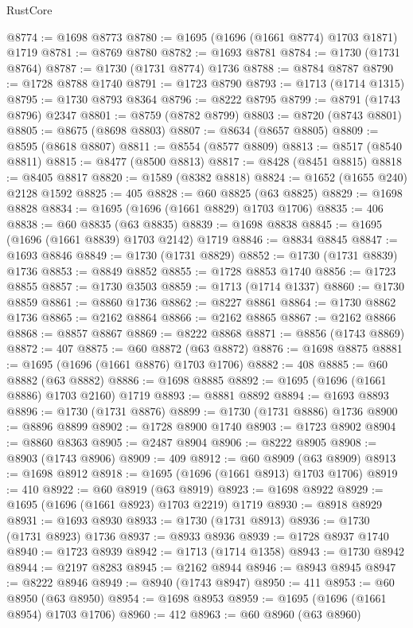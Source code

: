 \begin{lexlean}{RustCore}
\begin{coremodule}
@8774 := @1698 @8773
@8780 := @1695 (@1696 (@1661 @8774) @1703 @1871) @1719
@8781 := @8769 @8780
@8782 := @1693 @8781
@8784 := @1730 (@1731 @8764)
@8787 := @1730 (@1731 @8774) @1736
@8788 := @8784 @8787
@8790 := @1728 @8788 @1740
@8791 := @1723 @8790
@8793 := @1713 (@1714 @1315)
@8795 := @1730 @8793 @8364
@8796 := @8222 @8795
@8799 := @8791 (@1743 @8796) @2347
@8801 := @8759 (@8782 @8799)
@8803 := @8720 (@8743 @8801)
@8805 := @8675 (@8698 @8803)
@8807 := @8634 (@8657 @8805)
@8809 := @8595 (@8618 @8807)
@8811 := @8554 (@8577 @8809)
@8813 := @8517 (@8540 @8811)
@8815 := @8477 (@8500 @8813)
@8817 := @8428 (@8451 @8815)
@8818 := @8405 @8817
@8820 := @1589 (@8382 @8818)
@8824 := @1652 (@1655 @240) @2128 @1592
@8825 := 405
@8828 := @60 @8825 (@63 @8825)
@8829 := @1698 @8828
@8834 := @1695 (@1696 (@1661 @8829) @1703 @1706)
@8835 := 406
@8838 := @60 @8835 (@63 @8835)
@8839 := @1698 @8838
@8845 := @1695 (@1696 (@1661 @8839) @1703 @2142) @1719
@8846 := @8834 @8845
@8847 := @1693 @8846
@8849 := @1730 (@1731 @8829)
@8852 := @1730 (@1731 @8839) @1736
@8853 := @8849 @8852
@8855 := @1728 @8853 @1740
@8856 := @1723 @8855
@8857 := @1730 @3503
@8859 := @1713 (@1714 @1337)
@8860 := @1730 @8859
@8861 := @8860 @1736
@8862 := @8227 @8861
@8864 := @1730 @8862 @1736
@8865 := @2162 @8864
@8866 := @2162 @8865
@8867 := @2162 @8866
@8868 := @8857 @8867
@8869 := @8222 @8868
@8871 := @8856 (@1743 @8869)
@8872 := 407
@8875 := @60 @8872 (@63 @8872)
@8876 := @1698 @8875
@8881 := @1695 (@1696 (@1661 @8876) @1703 @1706)
@8882 := 408
@8885 := @60 @8882 (@63 @8882)
@8886 := @1698 @8885
@8892 := @1695 (@1696 (@1661 @8886) @1703 @2160) @1719
@8893 := @8881 @8892
@8894 := @1693 @8893
@8896 := @1730 (@1731 @8876)
@8899 := @1730 (@1731 @8886) @1736
@8900 := @8896 @8899
@8902 := @1728 @8900 @1740
@8903 := @1723 @8902
@8904 := @8860 @8363
@8905 := @2487 @8904
@8906 := @8222 @8905
@8908 := @8903 (@1743 @8906)
@8909 := 409
@8912 := @60 @8909 (@63 @8909)
@8913 := @1698 @8912
@8918 := @1695 (@1696 (@1661 @8913) @1703 @1706)
@8919 := 410
@8922 := @60 @8919 (@63 @8919)
@8923 := @1698 @8922
@8929 := @1695 (@1696 (@1661 @8923) @1703 @2219) @1719
@8930 := @8918 @8929
@8931 := @1693 @8930
@8933 := @1730 (@1731 @8913)
@8936 := @1730 (@1731 @8923) @1736
@8937 := @8933 @8936
@8939 := @1728 @8937 @1740
@8940 := @1723 @8939
@8942 := @1713 (@1714 @1358)
@8943 := @1730 @8942
@8944 := @2197 @8283
@8945 := @2162 @8944
@8946 := @8943 @8945
@8947 := @8222 @8946
@8949 := @8940 (@1743 @8947)
@8950 := 411
@8953 := @60 @8950 (@63 @8950)
@8954 := @1698 @8953
@8959 := @1695 (@1696 (@1661 @8954) @1703 @1706)
@8960 := 412
@8963 := @60 @8960 (@63 @8960)

\end{coremodule}
\end{lexlean}
